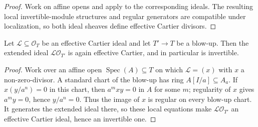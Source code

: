 \begin{proof}
  \leanok
  Work on affine opens and apply
   to the corresponding
  ideals.  The resulting local invertible-module structures and regular
  generators are compatible under localization, so both ideal sheaves define
  effective Cartier divisors.
\end{proof}

\begin{lemma}
  \label{lemma:nagata-cartier-total-transform-blowup}
  \leanok

  Let $\mathcal L\subseteq\mathcal O_T$ be an effective Cartier ideal and let
  $T'\to T$ be a blow-up.  Then the extended ideal
  $\mathcal L\mathcal O_{T'}$ is again effective Cartier, and in particular
  is invertible.
\end{lemma}

\begin{proof}
  \leanok
  Work over an affine open $\operatorname{Spec}(A)\subseteq T$ on which
  $\mathcal L=(x)$ with $x$ a non-zero-divisor.  A standard chart of the
  blow-up has ring $A[I/a]\subseteq A_a$.  If
  $x(y/a^n)=0$ in this chart, then $a^mxy=0$ in $A$ for some $m$; regularity
  of $x$ gives $a^my=0$, hence $y/a^n=0$.  Thus the image of $x$ is regular
  on every blow-up chart.  It generates the extended ideal there, so these
  local equations make $\mathcal L\mathcal O_{T'}$ an effective Cartier
  ideal, hence an invertible one.
\end{proof}

